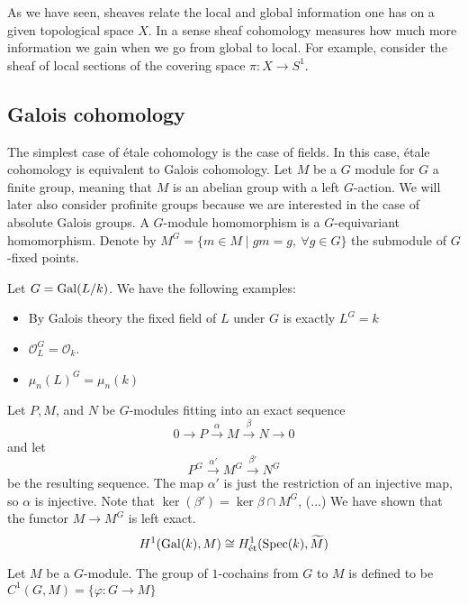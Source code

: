 As we have seen, sheaves relate the local and global information one has on a given topological space $X$. In a sense sheaf cohomology measures how much more information we gain when we go from global to local. For example, consider the sheaf of local sections of the covering space $\pi : X \to S^1$.

\subsection{Galois cohomology}
The simplest case of \'etale cohomology is the case of fields. In this case, \'etale cohomology is equivalent to Galois cohomology.
Let $M$ be a $G$ module for $G$ a finite group, meaning that $M$ is an abelian group with a left $G$-action. We will later also consider profinite groups because we are interested in the case of absolute Galois groups. A $G$-module homomorphism is a $G$-equivariant homomorphism. Denote by $M^G = \{m \in M \mid gm = g, \ \forall g \in G\}$ the submodule of $G$-fixed points.
\begin{example}
	Let $G = \operatorname{Gal}(L/k)$. We have the following examples:
	\begin{itemize}
		\item By Galois theory the fixed field of $L$ under $G$ is exactly $L^G = k$
		\item $\mathcal{O}_L^G = \mathcal{O}_k$.
		\item $\mu_n(L)^G = \mu_n(k)$
	\end{itemize}
\end{example}

Let $P, M$, and $N$ be $G$-modules fitting into an exact sequence 
\[
	0 \to P \xrightarrow{\alpha} M \xrightarrow{\beta} N \to 0
\]
and let 
\[
	P^G \xrightarrow{\alpha'} M^G \xrightarrow{\beta'} N^G
\]
be the resulting sequence. The map $\alpha'$ is just the restriction of an injective map, so $\alpha$ is injective. Note that $\ker(\beta') = \ker \beta \cap M^G$, (...)
We have shown that the functor $M \to M^G$ is left exact.
\[H^1(\operatorname{Gal}(k),M) \cong H_\text{\'et}^1(\operatorname{Spec}(k), \widetilde{M})\]

\begin{definition}
	Let $M$ be a $G$-module. The group of $1$-cochains from $G$ to $M$ is defined to be  $C^1(G, M) = \{\varphi: G \to M\}$
\end{definition}

